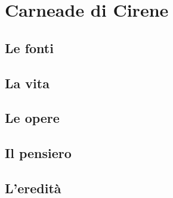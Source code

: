 \chapter{Carneade di Cirene}

\section{Le fonti}

\section{La vita}

\section{Le opere}

\section{Il pensiero}

\section{L'eredità}
